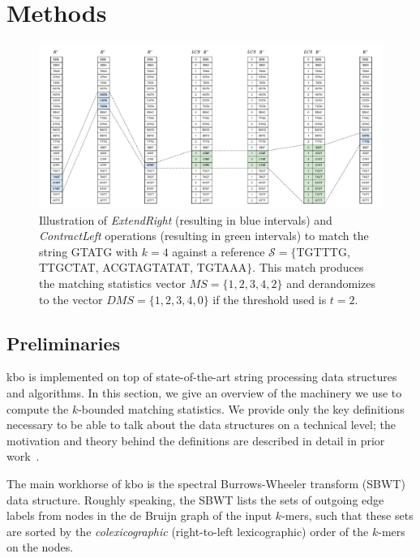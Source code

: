 \documentclass[unnumsec,webpdf,modern,large]{biorxiv}%
\theoremstyle{thmstyleone}%
\theoremstyle{thmstyletwo}%
\theoremstyle{thmstylethree}%
\begin{document}
\section{Methods}\label{methods}

\begin{figure}[b]
    \centering
    \includegraphics[scale=0.6]{fig/SBWT_search_LCS.drawio.pdf}
    \caption{Illustration of {\em ExtendRight} (resulting in blue intervals) and {\em ContractLeft} operations (resulting in green intervals) to match the string {\sf GTATG} with $k=4$ against a reference $\mathcal{S}= \{${\sf TGTTTG}, {\sf TTGCTAT}, {\sf ACGTAGTATAT}, {\sf TGTAAA}$\}$. This match produces the matching statistics vector $MS=\{ 1, 2, 3, 4, 2 \}$ and derandomizes to the vector $DMS=\{ 1, 2, 3, 4, 0 \}$ if the threshold used is $t = 2$. }
    \label{fig:sbwt-search}
\end{figure}

\subsection{Preliminaries}\label{preliminaries}

{\sf kbo} is implemented on top of state-of-the-art string processing data structures and algorithms. In this section, we give an overview of the machinery we use to compute the $k$-bounded matching statistics. We provide only the key definitions necessary to be able to talk about the data structures on a technical level; the motivation and theory behind the definitions are described in detail in prior work~\cite{alanko2023longest, alanko2024finimizers, alanko2023small}.




The main workhorse of {\sf kbo} is the spectral Burrows-Wheeler transform (SBWT) data structure. Roughly speaking, the SBWT lists the sets of outgoing edge labels from nodes in the de Bruijn graph of the input $k$-mers, such that these sets are sorted by the \emph{colexicographic} (right-to-left lexicographic) order of the $k$-mers on the nodes.
\end{document}

